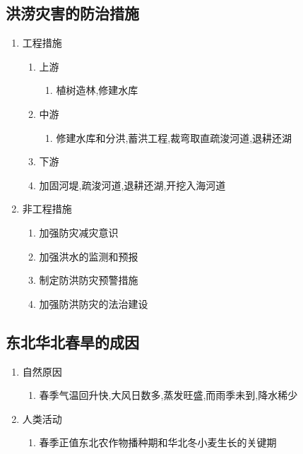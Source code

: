 \documentclass[a4paper]{article}
\begin{document}
    \subsection{洪涝灾害的防治措施}
    \begin{enumerate}
        \item 工程措施
        \begin{enumerate}
            \item 上游
            \begin{enumerate}
                \item 植树造林,修建水库
            \end{enumerate}
            \item 中游
            \begin{enumerate}
                \item 修建水库和分洪,蓄洪工程,裁弯取直疏浚河道,退耕还湖
            \end{enumerate}
            \item 下游
            \item 加固河堤,疏浚河道,退耕还湖,开挖入海河道
        \end{enumerate}
        \item 非工程措施
        \begin{enumerate}
            \item 加强防灾减灾意识
            \item 加强洪水的监测和预报
            \item 制定防洪防灾预警措施
            \item 加强防洪防灾的法治建设
        \end{enumerate}
    \end{enumerate}
    \subsection{东北华北春旱的成因}
    \begin{enumerate}
        \item 自然原因
        \begin{enumerate}
            \item 春季气温回升快,大风日数多,蒸发旺盛,而雨季未到,降水稀少
        \end{enumerate}
        \item 人类活动
        \begin{enumerate}
            \item 春季正值东北农作物播种期和华北冬小麦生长的关键期
        \end{enumerate}
    \end{enumerate}
\end{document}
